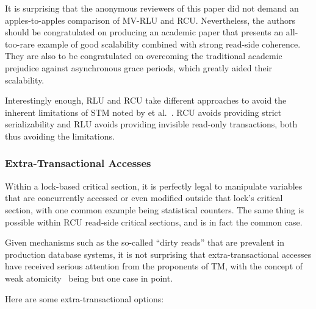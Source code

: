 {	It is surprising that the anonymous reviewers of this paper did
	not demand an apples-to-apples comparison of MV-RLU and RCU\@.
	Nevertheless, the authors should be congratulated on producing
	an academic paper that presents an all-too-rare example of good
	scalability combined with strong read-side coherence.
	They are also to be congratulated on overcoming the traditional
	academic prejudice against asynchronous grace periods,
	which greatly aided their scalability.

	Interestingly enough, RLU and RCU take different approaches to avoid
	the inherent limitations of STM noted by  et
	al.~\cite{Attiya:2009:STMReadOnlyLimits}.
	RCU avoids providing strict serializability and RLU avoids providing
	invisible read-only transactions, both thus avoiding the
	limitations.
}\QuickQuizEnd

\subsubsection{Extra-Transactional Accesses}
\label{sec:future:Extra-Transactional Accesses}

Within a lock-based critical section, it is perfectly legal to manipulate
variables that are concurrently accessed or even modified outside that
lock's critical section, with one common example being statistical
counters.
The same thing is possible within RCU read-side critical
sections, and is in fact the common case.

Given mechanisms such as the so-called ``dirty reads'' that are
prevalent in production database systems, it is not surprising
that extra-transactional accesses have received serious attention
from the proponents of TM, with the concept of weak
atomicity~\cite{Blundell2006TMdeadlock} being but one case in point.

Here are some extra-transactional options:

